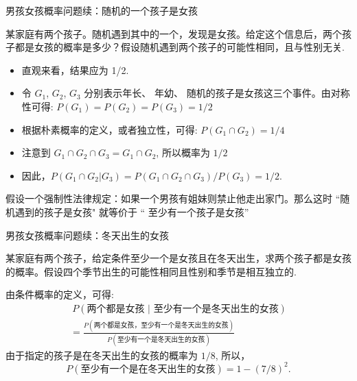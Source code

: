 \documentclass[Prob-All.tex]{subfiles}
\begin{document}
%

\begin{frame}{男孩女孩概率问题续：随机的一个孩子是女孩}
    \begin{exam}
        某家庭有两个孩子。随机遇到其中的一个，发现是女孩。给定这个信息后，两个孩子都是女孩的概率是多少？假设随机遇到两个孩子的可能性相同，且与性别无关.
    \end{exam}

    \begin{jieda}
        \begin{itemize}[<+-|alert@+>]
            \item 直观来看，结果应为 1/2.
            \item 令 $G_{1}$, $G_{2}$, $G_{3}$ 分别表示年长、 年幼、 随机的孩子是女孩这三个事件。由对称性可得: $P (G_{1})=P (G_{2})=P (G_{3})=1/2$
            \item 根据朴素概率的定义，或者独立性，可得: $P (G_{1}\cap G_{2})=1/4$
            \item 注意到 $G_{1}\cap G_{2}\cap G_{3}=G_{1}\cap G_{2}$, 所以概率为 $1/2$
			\item 因此，$P (G_{1}\cap G_{2}|G_{3})=P (G_{1}\cap G_{2}\cap G_{3})/P (G_{3})=1/2$.
        \end{itemize}
    \end{jieda}
	\pause
	\begin{rmk}
	假设一个强制性法律规定：如果一个男孩有姐妹则禁止他走出家门。那么这时 ``随机遇到的孩子是女孩" 就等价于 `` 至少有一个孩子是女孩”
	\end{rmk}

\end{frame}

%
\begin{frame}{男孩女孩概率问题续：冬天出生的女孩}
\begin{exam}
	某家庭有两个孩子，给定条件至少一个是女孩且在冬天出生，求两个孩子都是女孩的概率。假设四个季节出生的可能性相同且性别和季节是相互独立的.
\end{exam}
\pause

    \begin{jieda}
        由条件概率的定义，可得:
        \begin{align*}
            \ P (\mbox{两个都是女孩 | 至少有一个是冬天出生的女孩})\\
            =\frac{P (\mbox{两个都是女孩，至少有一个是冬天出生的女孩})}{P (\mbox{至少有一个是冬天出生的女孩})}
        \end{align*}\pause
		由于指定的孩子是在冬天出生的女孩的概率为 $1/8$, 所以，$$P (\mbox{至少有一个是在冬天出生的女孩}) = 1 - (7/8)^2.$$
    \end{jieda}
\end{frame}
\end{document}
